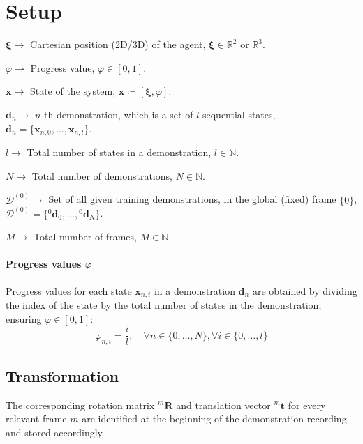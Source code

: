 \section{Setup}\label{sec:setup}

\( \boldsymbol{\xi} \to \) Cartesian position (2D/3D) of the agent, \( \boldsymbol{\xi} \in \mathbb{R}^2 \) or \( \mathbb{R}^3 \).

\( \varphi \to \) Progress value, \( \varphi \in [0, 1] \).

\( \boldsymbol{x} \to \) State of the system, \( \boldsymbol{x} \coloneq [\boldsymbol{\xi}, \varphi] \).

\( \boldsymbol{d}_n \to \) \( n \)-th demonstration, which is a set of \( l \) sequential states, \( \boldsymbol{d}_n = \{ \boldsymbol{x}_{n, 0}, \ldots, \boldsymbol{x}_{n, l} \} \).

\( l \to \) Total number of states in a demonstration, \( l \in \mathbb{N} \).

\( N \to \) Total number of demonstrations, \( N \in \mathbb{N} \).

\( \mathcal{D}^{(0)} \to \) Set of all given training demonstrations, in the global (fixed) frame \( \{ 0 \} \), \( \mathcal{D}^{(0)} = \{ {}^{0}\boldsymbol{d}_0, \ldots, {}^{0}\boldsymbol{d}_N \} \).

\( M \to \) Total number of frames, \( M \in \mathbb{N} \).

\paragraph{Progress values \( \varphi \)}
Progress values for each state \( \boldsymbol{x}_{n, i} \) in a demonstration \( \boldsymbol{d}_n \) are obtained by dividing the index of the state by the total number of states in the demonstration, ensuring \( \varphi \in [0, 1] \):
\begin{equation}
    \varphi_{n, i} = \frac{i}{l}, \quad \forall n \in \{ 0, \ldots, N \}, \forall i \in \{ 0, \ldots, l \}
\end{equation}

\subsection{Transformation}\label{sec:transformation}

The corresponding rotation matrix \( {}^{m}\boldsymbol{R} \) and translation vector \( {}^{m}\boldsymbol{t} \) for every relevant frame \( m \) are identified at the beginning of the demonstration recording and stored accordingly.

